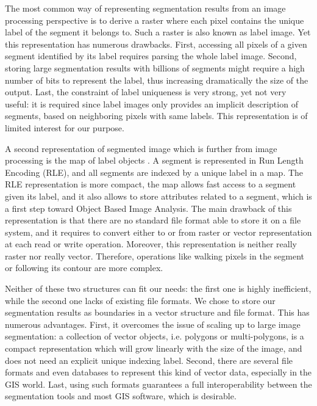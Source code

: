 \documentclass{josis}
\begin{document}
The most common way of representing segmentation results from an image
processing perspective is to derive a raster where each pixel contains
the unique label of the segment it belongs to. Such a raster is also
known as label image. Yet this representation has numerous
drawbacks. First, accessing all pixels of a given segment identified
by its label requires parsing the whole label image. Second, storing
large segmentation results with billions of segments might require a
high number of bits to represent the label, thus increasing
dramatically the size of the output. Last, the constraint of label
uniqueness is very strong, yet not very useful: it is required since
label images only provides an implicit description of segments, based
on neighboring pixels with same labels. This representation is of
limited interest for our purpose.

A second representation of segmented image which is further from image
processing is the map of label objects \cite{lehmann2008label}. A segment is
represented in Run Length Encoding (RLE), and all segments are indexed
by a unique label in a map. The RLE representation is more compact,
the map allows fast access to a segment given its label, and it also
allows to store attributes related to a segment, which is a first step
toward Object Based Image Analysis. The main drawback of this
representation is that there are no standard file format able to store
it on a file system, and it requires to convert either to or from
raster or vector representation at each read or write
operation. Moreover, this representation is neither really raster nor
really vector. Therefore, operations like walking pixels in the
segment or following its contour are more complex.

Neither of these two structures can fit our needs: the first one is
highly inefficient, while the second one lacks of existing file
formats. We chose to store our segmentation results as boundaries in a
vector structure and file format. This has numerous advantages. First,
it overcomes the issue of scaling up to large image segmentation: a
collection of vector objects, i.e. polygons or multi-polygons, is a
compact representation which will grow linearly with the size of the
image, and does not need an explicit unique indexing label. Second,
there are several file formats and even databases to represent this
kind of vector data, especially in the GIS world. Last, using such
formats guarantees a full interoperability between the segmentation
tools and most GIS software, which is desirable.
\end{document}
